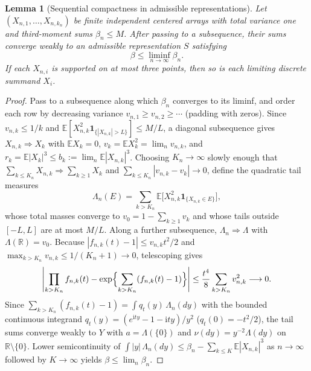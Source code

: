 \documentclass[11pt]{article}
\numberwithin{equation}{section}
\newtheorem{lemma}[theorem]{Lemma}
\theoremstyle{definition}
\newcommand{\E}{\mathbb E}
\newcommand{\R}{\mathbb R}
\newcommand{\ind}{\mathbf1}
\newcommand{\ii}{\mathrm i}
\begin{document}
\begin{lemma}[Sequential compactness in admissible representations]\label{lem:compactness}
Let $(X_{n,1},\ldots,X_{n,k_n})$ be finite independent centered arrays with
total variance one and third-moment sums $\beta_n\le M$. After passing to a
subsequence, their sums converge weakly to an admissible representation $S$
satisfying
\[
                      \beta\le\liminf_{n\to\infty}\beta_n.
\]
If each $X_{n,i}$ is supported on at most three points, then so is each
limiting discrete summand $X_i$.
\end{lemma}
\begin{proof}
Pass to a subsequence along which $\beta_n$ converges to its liminf, and
order each row by decreasing variance $v_{n,1}\ge v_{n,2}\ge\cdots$ (padding
with zeros). Since $v_{n,k}\le1/k$ and $\E[X_{n,k}^2\ind_{\{|X_{n,k}|>L\}}]\le M/L$,
a diagonal subsequence gives $X_{n,k}\Rightarrow X_k$ with $\E X_k=0$,
$v_k=\E X_k^2=\lim_n v_{n,k}$, and $r_k=\E|X_k|^3\le b_k:=\lim_n\E|X_{n,k}|^3$.
Choosing $K_n\to\infty$ slowly enough that $\sum_{k\le K_n}X_{n,k}\Rightarrow\sum_{k\ge1}X_k$
and $\sum_{k\le K_n}|v_{n,k}-v_k|\to0$, define the quadratic tail measures
\[
 \Lambda_n(E)=\sum_{k>K_n}\E\bigl[X_{n,k}^2\ind_{\{X_{n,k}\in E\}}\bigr],
\]
whose total masses converge to $v_0=1-\sum_{k\ge1}v_k$ and whose tails outside
$[-L,L]$ are at most $M/L$. Along a further subsequence, $\Lambda_n\Rightarrow\Lambda$
with $\Lambda(\R)=v_0$. Because $|f_{n,k}(t)-1|\le v_{n,k}t^2/2$ and
$\max_{k>K_n}v_{n,k}\le1/(K_n+1)\to0$, telescoping gives
\begin{equation}\label{eq:poissonization}
 \left|\prod_{k>K_n}f_{n,k}(t)-\exp\Bigl\{\sum_{k>K_n}(f_{n,k}(t)-1)\Bigr\}\right|
                  \le\frac{t^4}{8}\sum_{k>K_n}v_{n,k}^2\longrightarrow0.
\end{equation}
Since $\sum_{k>K_n}(f_{n,k}(t)-1)=\int q_t(y)\,\Lambda_n(dy)$ with the bounded
continuous integrand $q_t(y)=(e^{\ii ty}-1-\ii ty)/y^2$ ($q_t(0)=-t^2/2$),
the tail sums converge weakly to $Y$ with $a=\Lambda(\{0\})$ and
$\nu(dy)=y^{-2}\Lambda(dy)$ on $\R\setminus\{0\}$. Lower semicontinuity of
$\int|y|\,\Lambda_n(dy)\le\beta_n-\sum_{k\le K}\E|X_{n,k}|^3$ as $n\to\infty$
followed by $K\to\infty$ yields $\beta\le\lim_n\beta_n$.
\end{proof}
\end{document}
